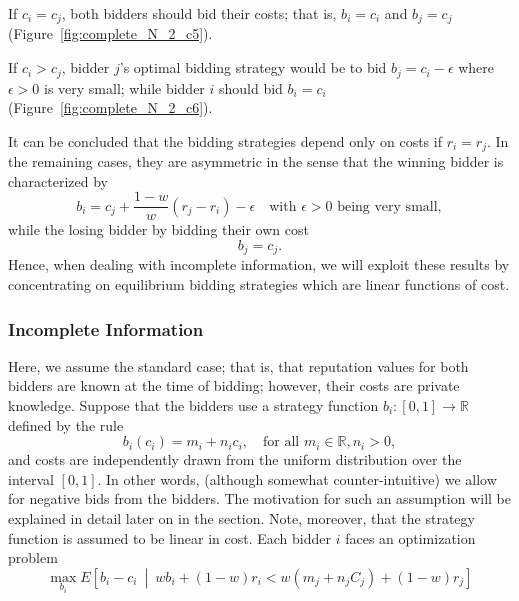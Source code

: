 If $c_i = c_j$, both bidders should bid their costs; that is, $b_i = c_i$ and $b_j = c_j$ (Figure~\ref{fig:complete_N_2_c5}).

If $c_i > c_j$, bidder $j$'s optimal bidding strategy would be to bid $b_j = c_i - \epsilon$ where $\epsilon>0$ is very small; while bidder $i$ should bid $b_i = c_i$ (Figure~\ref{fig:complete_N_2_c6}).

It can be concluded that the bidding strategies depend only on costs if $r_i = r_j$. In the remaining cases, they are asymmetric in the sense that the winning bidder is characterized by
\begin{equation*}
	b_i = c_j + \frac{1-w}{w}(r_j - r_i) - \epsilon \quad\text{with }\epsilon>0\text{ being very small},
\end{equation*}
while the losing bidder by bidding their own cost
\begin{equation*}
	b_j = c_j.
\end{equation*}
Hence, when dealing with incomplete information, we will exploit these results by concentrating on equilibrium bidding strategies which are linear functions of cost.

\subsubsection{Incomplete Information} %
\label{ssub:incomplete_information_n_2}
Here, we assume the standard case; that is, that reputation values for both bidders are known at the time of bidding; however, their costs are private knowledge. Suppose that the bidders use a strategy function $b_i: [0,1]\to\mathbb{R}$ defined by the rule
\begin{equation}
	\label{eq:pcomp_bidding_str}
	b_i(c_i) = m_i + n_i c_i,\quad\text{for all } m_i\in\mathbb{R},n_i>0,
\end{equation}
and costs are independently drawn from the uniform distribution over the interval $[0,1]$. In other words, (although somewhat counter-intuitive) we allow for negative bids from the bidders. The motivation for such an assumption will be explained in detail later on in the section. Note, moreover, that the strategy function is assumed to be linear in cost. Each bidder $i$ faces an optimization problem
\begin{equation}
	\label{eq:pcomp_exp_utility_uc}
	\max_{b_i}E \left[ b_i-c_i \:\middle\vert\: wb_i + (1-w)r_i < w(m_j + n_j C_j) + (1-w)r_j\right]
\end{equation}

